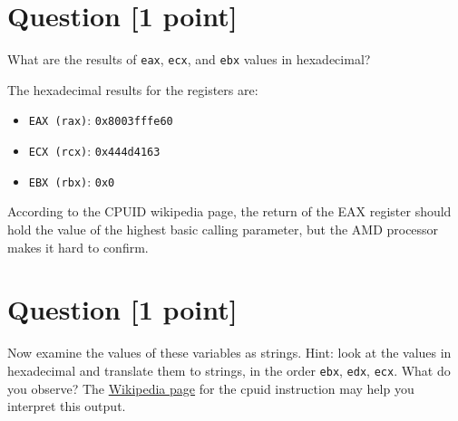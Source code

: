 \documentclass[11pt]{article}
\begin{document}
\section{Question [1 point]}

What are the results of \texttt{eax}, \texttt{ecx}, and \texttt{ebx} values in hexadecimal?

\begin{solution}
\item The hexadecimal results for the registers are:
    \begin{itemize}
        \item \texttt{EAX (rax)}: \texttt{0x8003fffe60}
        \item \texttt{ECX (rcx)}: \texttt{0x444d4163}
        \item \texttt{EBX (rbx)}: \texttt{0x0}
    \end{itemize}
According to the CPUID wikipedia page, the return of the EAX register should hold the value of the highest basic calling parameter, but the AMD processor makes it hard to confirm.
\end{solution}


\section{Question [1 point]}

Now examine the values of these variables as strings. Hint: look at the values in hexadecimal and translate them to strings, in the order \texttt{ebx}, \texttt{edx}, \texttt{ecx}. What do you observe? The \href{https://en.wikipedia.org/wiki/CPUID}{Wikipedia page} for the cpuid instruction may help you interpret this output.
\end{document}
